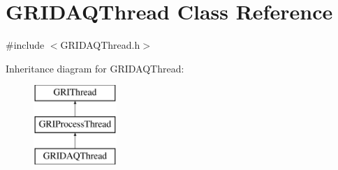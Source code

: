 \hypertarget{classGRIDAQThread}{\section{\-G\-R\-I\-D\-A\-Q\-Thread \-Class \-Reference}
\label{classGRIDAQThread}
}


{\ttfamily \#include $<$\-G\-R\-I\-D\-A\-Q\-Thread.\-h$>$}

\-Inheritance diagram for \-G\-R\-I\-D\-A\-Q\-Thread\-:\begin{figure}[H]
\begin{center}
\leavevmode
\includegraphics[height=3.000000cm]{classGRIDAQThread}
\end{center}
\end{figure}
